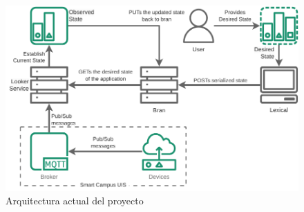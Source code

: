 
\begin{figure}[ht]
    \centering
    \caption{Arquitectura actual del proyecto}
    \label{fig:StarDuckBasic}
    \includegraphics[width=\linewidth]{images/StarDuckBasic.pdf}
\end{figure}



